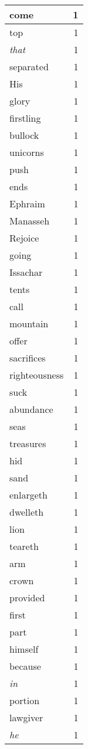 \begin{center}
\begin{longtable}{l|r}
come & 1 \\ \hline
top & 1 \\ \hline
\emph{that} & 1 \\ \hline
separated & 1 \\ \hline
His & 1 \\ \hline
glory & 1 \\ \hline
firstling & 1 \\ \hline
bullock & 1 \\ \hline
unicorns & 1 \\ \hline
push & 1 \\ \hline
ends & 1 \\ \hline
Ephraim & 1 \\ \hline
Manasseh & 1 \\ \hline
Rejoice & 1 \\ \hline
going & 1 \\ \hline
Issachar & 1 \\ \hline
tents & 1 \\ \hline
call & 1 \\ \hline
mountain & 1 \\ \hline
offer & 1 \\ \hline
sacrifices & 1 \\ \hline
righteousness & 1 \\ \hline
suck & 1 \\ \hline
abundance & 1 \\ \hline
seas & 1 \\ \hline
treasures & 1 \\ \hline
hid & 1 \\ \hline
sand & 1 \\ \hline
enlargeth & 1 \\ \hline
dwelleth & 1 \\ \hline
lion & 1 \\ \hline
teareth & 1 \\ \hline
arm & 1 \\ \hline
crown & 1 \\ \hline
provided & 1 \\ \hline
first & 1 \\ \hline
part & 1 \\ \hline
himself & 1 \\ \hline
because & 1 \\ \hline
\emph{in} & 1 \\ \hline
portion & 1 \\ \hline
lawgiver & 1 \\ \hline
\emph{he} & 1 \\ \hline

\end{longtable}
\end{center}
